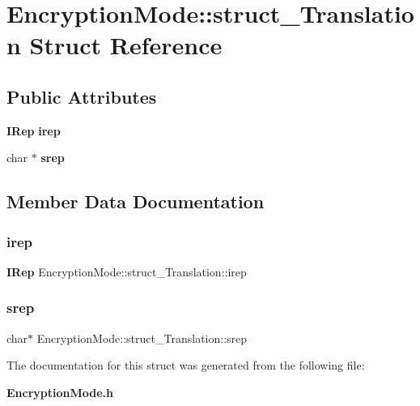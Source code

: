 \section{Encryption\+Mode\+:\+:struct\+\_\+\+Translation Struct Reference}
\label{structEncryptionMode_1_1struct__Translation}
\subsection*{Public Attributes}
\begin{DoxyCompactItemize}
\item 
\textbf{ I\+Rep} \textbf{ irep}
\item 
char $\ast$ \textbf{ srep}
\end{DoxyCompactItemize}


\subsection{Member Data Documentation}
\mbox{\label{structEncryptionMode_1_1struct__Translation_a0ff73c861d0ca04fc5a4e23df8ccda6e}} 
\subsubsection{irep}
{\footnotesize\ttfamily \textbf{ I\+Rep} Encryption\+Mode\+::struct\+\_\+\+Translation\+::irep}

\mbox{\label{structEncryptionMode_1_1struct__Translation_ab3a09dc5bcb8c6d7a30cd5e2967345dd}} 
\subsubsection{srep}
{\footnotesize\ttfamily char$\ast$ Encryption\+Mode\+::struct\+\_\+\+Translation\+::srep}



The documentation for this struct was generated from the following file\+:\begin{DoxyCompactItemize}
\item 
\textbf{ Encryption\+Mode.\+h}\end{DoxyCompactItemize}
